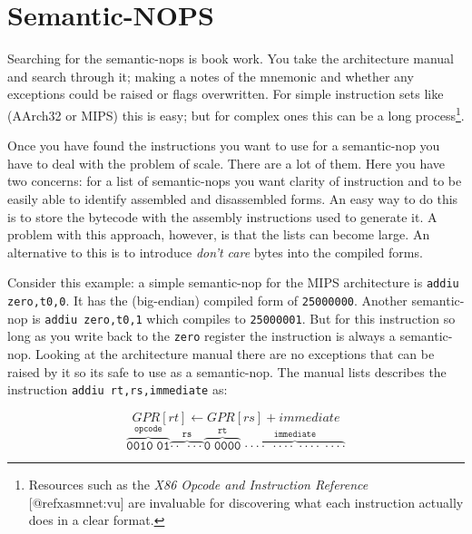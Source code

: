 \documentclass[]{book}
\begin{document}
\section{Semantic-NOPS}

Searching for the semantic-nops is book work. You take the architecture
manual and search through it; making a notes of the mnemonic and whether
any exceptions could be raised or flags overwritten. For simple
instruction sets like (AArch32 or MIPS) this is easy; but for complex
ones this can be a long process\footnote{Resources such as the \emph{X86
  Opcode and Instruction Reference} {[}@refxasmnet:vu{]} are invaluable
  for discovering what each instruction actually does in a clear format.}.

Once you have found the instructions you want to use for a semantic-nop
you have to deal with the problem of scale. There are a lot of them.
Here you have two concerns: for a list of semantic-nops you want clarity
of instruction and to be easily able to identify assembled and
disassembled forms. An easy way to do this is to store the bytecode with
the assembly instructions used to generate it. A problem with this
approach, however, is that the lists can become large. An alternative to
this is to introduce \emph{don't care} bytes into the compiled forms.

Consider this example: a simple semantic-nop for the MIPS architecture
is \lstinline!addiu zero,t0,0!. It has the (big-endian) compiled form of
\lstinline!25000000!. Another semantic-nop is
\lstinline!addiu zero,t0,1! which compiles to \lstinline!25000001!. But
for this instruction so long as you write back to the \lstinline!zero!
register the instruction is always a semantic-nop. Looking at the
architecture manual\autocite{MIPSTechnologiesInc:2011ta} there are no
exceptions that can be raised by it so its safe to use as a
semantic-nop. The manual lists describes the instruction
\lstinline!addiu rt,rs,immediate! as:

\[GPR[rt] \gets GPR[rs] + immediate\]
\[\mathtt{\overbrace{0010\;01}^\text{opcode}
\overbrace{\cdot\cdot\;\cdot\cdot\cdot}^\text{rs}
\overbrace{0\;0000}^\text{rt}\; \overbrace{\cdot\cdot\cdot\cdot\;
\cdot\cdot\cdot\cdot\; \cdot\cdot\cdot\cdot\;
\cdot\cdot\cdot\cdot}^\text{immediate}}\]
\end{document}
